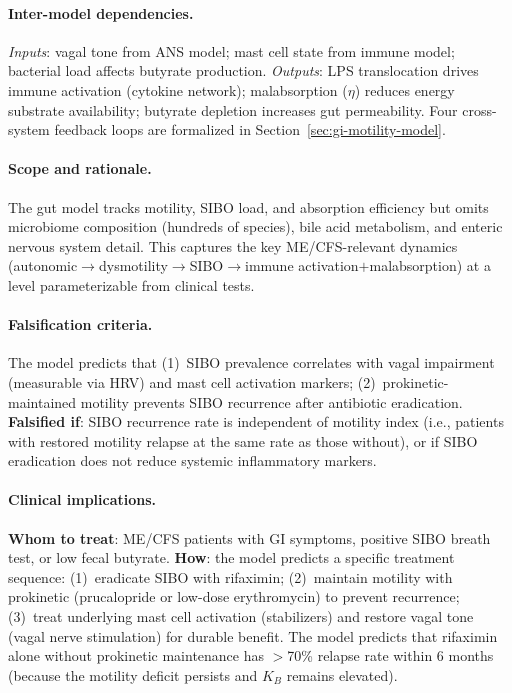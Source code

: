 \paragraph{Inter-model dependencies.}
\emph{Inputs}: vagal tone from ANS model; mast cell state from immune model; bacterial load affects butyrate production. \emph{Outputs}: LPS translocation drives immune activation (cytokine network); malabsorption ($\eta$) reduces energy substrate availability; butyrate depletion increases gut permeability. Four cross-system feedback loops are formalized in Section~\ref{sec:gi-motility-model}.

\paragraph{Scope and rationale.}
The gut model tracks motility, SIBO load, and absorption efficiency but omits microbiome composition (hundreds of species), bile acid metabolism, and enteric nervous system detail. This captures the key ME/CFS-relevant dynamics (autonomic$\to$dysmotility$\to$SIBO$\to$immune activation$+$malabsorption) at a level parameterizable from clinical tests.

\paragraph{Falsification criteria.}
The model predicts that (1)~SIBO prevalence correlates with vagal impairment (measurable via HRV) and mast cell activation markers; (2)~prokinetic-maintained motility prevents SIBO recurrence after antibiotic eradication. \textbf{Falsified if}: SIBO recurrence rate is independent of motility index (i.e., patients with restored motility relapse at the same rate as those without), or if SIBO eradication does not reduce systemic inflammatory markers.

\paragraph{Clinical implications.}
\textbf{Whom to treat}: ME/CFS patients with GI symptoms, positive SIBO breath test, or low fecal butyrate. \textbf{How}: the model predicts a specific treatment sequence: (1)~eradicate SIBO with rifaximin; (2)~maintain motility with prokinetic (prucalopride or low-dose erythromycin) to prevent recurrence; (3)~treat underlying mast cell activation (stabilizers) and restore vagal tone (vagal nerve stimulation) for durable benefit. The model predicts that rifaximin alone without prokinetic maintenance has $>$70\% relapse rate within 6 months (because the motility deficit persists and $K_B$ remains elevated).

